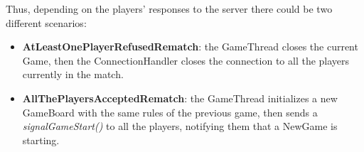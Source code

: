 \documentclass[12pt]{article}
\begin{document}
			Thus, depending on the players’ responses to the server there could be two different scenarios:
			\begin{itemize}
				\item \textbf{AtLeastOnePlayerRefusedRematch}: the GameThread closes the current Game, then the ConnectionHandler closes the connection to all the players currently in the match.
				\item \textbf{AllThePlayersAcceptedRematch}: the GameThread initializes a new GameBoard with the same rules of the previous game, then sends a \emph{signalGameStart()} to all the players, notifying them that a NewGame is starting.
			\end{itemize}
\end{document}
